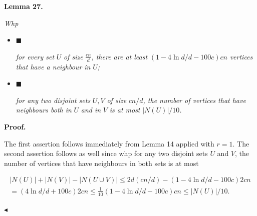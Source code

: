 

\par\medskip\noindent\textbf{
\textbf{Lemma 27}\textbf{.}
}\par



\emph{Whp}\par


\begin{itemize}


\item[] 
$\blacksquare$ 


\emph{for every set }$U$\emph{ of size }$\frac{cn}{d}$\emph{, there are at least }$(1-4\ln d/d-100c)cn$\emph{ vertices that have a neighbour in }$U$\emph{;}\par





\item[] 
$\blacksquare$ 


\emph{for any two disjoint sets }$U,V$\emph{ of size }$cn/d$\emph{, the number of vertices that have neighbours both in }$U$\emph{ and in }$V$\emph{ is at most }$|N(U)|/10$\emph{.}\par





\end{itemize}







\par\medskip\noindent\textbf{Proof.}\par




The first assertion follows immediately from Lemma 14 applied with $r=1$. The second assertion follows as well since whp for any two disjoint sets $U$ and $V$, the number of vertices that have neighbours in both sets is at most\par


\[\begin{gathered}
\displaystyle|N(U)|+|N(V)| \displaystyle-|N(U\cup V)|\leq 2d(cn/d)-(1-4\ln d/d-100c)2cn \\
\displaystyle=(4\ln d/d+100c)2cn\leq\frac{1}{10}(1-4\ln d/d-100c)cn\leq|N(U)|/10.\
\end{gathered}\]


$\blacktriangleleft$\par






